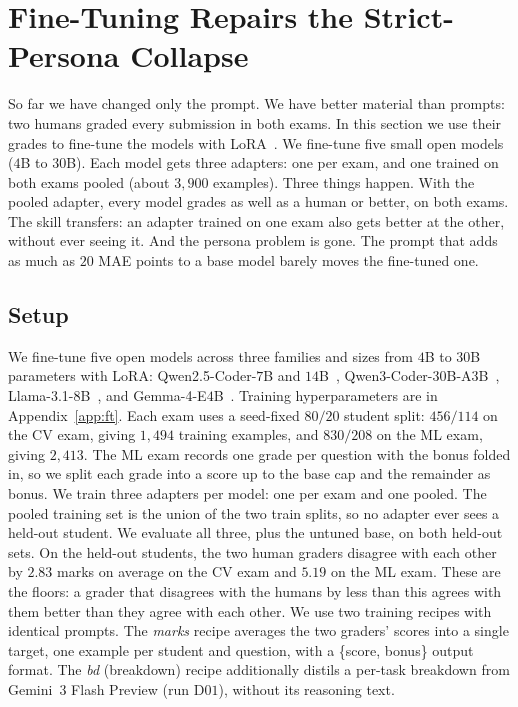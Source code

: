 \section{Fine-Tuning Repairs the Strict-Persona Collapse}
\label{sec:finetune}

  So far we have changed only the prompt. We have better material than prompts: two
  humans graded every submission in both exams. In this section we use their
  grades to fine-tune the models with LoRA~\citep{hu2021loralowrankadaptationlarge}.
  We fine-tune five small open models ($4$B to $30$B). Each model gets three
  adapters: one per exam, and one trained on both exams pooled (about
  $3{,}900$ examples). Three things happen. With the pooled
  adapter, every model grades as well as a human or better, on both exams.
  The skill transfers: an adapter trained on one exam also gets better at the
  other, without ever seeing it. And the persona problem is gone. The prompt
  that adds as much as $20$ MAE points to a base model barely moves the fine-tuned
  one.

\subsection{Setup}
\label{sec:finetune:setup}

  We fine-tune five open models across three families and sizes from $4$B to
  $30$B parameters with LoRA: Qwen2.5-Coder-$7$B and
  $14$B~\citep{hui2024qwen25codertechnicalreport},
  Qwen3-Coder-$30$B-A$3$B~\citep{yang2025qwen3technicalreport},
  Llama-3.1-$8$B~\citep{grattafiori2024llama3herdmodels}, and Gemma-4-E$4$B~\citep{gemmateam2026gemma4technicalreport}.
  Training hyperparameters are in Appendix~\ref{app:ft}. Each exam uses a seed-fixed $80/20$ student split: $456/114$ on the
  CV exam, giving $1{,}494$ training
  examples, and $830/208$ on the ML exam, giving $2{,}413$.
  The ML exam records one grade per question with the bonus
  folded in, so we split each grade into a score up to the base cap and the
  remainder as bonus. We train three adapters per model: one per exam and
  one pooled. The pooled training set is the union of the two train splits,
  so no adapter ever sees a held-out student. We evaluate all three, plus the
  untuned base, on both held-out sets. On the held-out students, the two human graders disagree with each other by
  $2.83$ marks on average on the CV exam and $5.19$ on the
  ML exam. These are the floors: a grader that disagrees with
  the humans by less than this agrees with them better than they agree with
  each other. We use two training recipes with identical prompts. The \emph{marks}
  recipe averages the two graders' scores into a single target, one example
  per student and question, with a \{score, bonus\} output format. The
  \emph{bd} (breakdown) recipe additionally distils a per-task breakdown from
  Gemini~3 Flash Preview (run D$01$), without its reasoning text.
